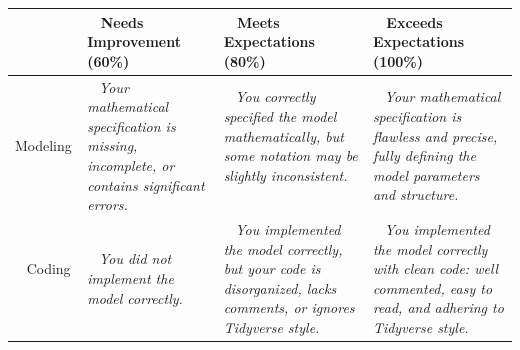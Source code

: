 \documentclass{article}
\begin{document}
        \vspace{5mm}
        \hspace{-15mm}
        \begin{tabular}{|>{\centering\arraybackslash}p{2.5cm}|>{\centering\arraybackslash}p{5cm}|>{\centering\arraybackslash}p{5cm}|>{\centering\arraybackslash}p{5cm}|}
          \hline
            ~
            \newline ~ & ~ \newline
            Needs Improvement (60\%)
            \newline ~ & ~ \newline
            Meets Expectations (80\%)
            \newline ~ & ~ \newline
            Exceeds Expectations (100\%)
            \newline ~\\
          \hline
          ~ \newline
          Modeling
            \newline ~ & ~ \newline
            \it Your mathematical specification is missing, incomplete, or contains significant errors.
            \newline ~ & ~ \newline
            \it You correctly specified the model mathematically, but some notation may be slightly inconsistent.
            \newline ~ & ~ \newline
            \it Your mathematical specification is flawless and precise, fully defining the model parameters and structure.
            \newline ~\\
          \hline
          ~ \newline
          Coding
            \newline ~ & ~ \newline
            \it You did not implement the model correctly.
            \newline ~ & ~ \newline
            \it You implemented the model correctly, but your code is disorganized, lacks comments, or ignores Tidyverse style.
            \newline ~ & ~ \newline
            \it You implemented the model correctly with clean code: well commented, easy to read, and adhering to Tidyverse style.
            \newline ~\\

\end{tabular}
\end{document}
